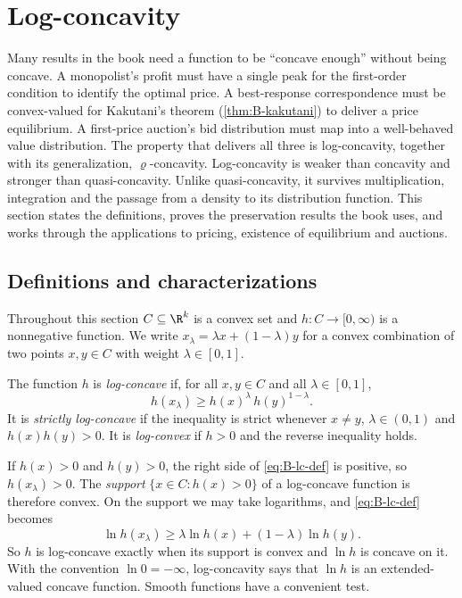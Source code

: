 \section{Log-concavity}\label{sec:B-logconcave}

Many results in the book need a function to be ``concave enough'' without being concave. A monopolist's
profit must have a single peak for the first-order condition to identify the optimal price. A
best-response correspondence must be convex-valued for Kakutani's theorem (\cref{thm:B-kakutani}) to deliver a
price equilibrium. A first-price auction's bid distribution must map into a well-behaved value distribution.
The property that delivers all three is log-concavity, together with its generalization,
$\varrho$-concavity. Log-concavity is weaker than concavity and stronger than quasi-concavity. Unlike
quasi-concavity, it survives multiplication, integration and the passage from a density to its
distribution function. This section states the definitions, proves the preservation results the book
uses, and works through the applications to pricing, existence of equilibrium and auctions.

\subsection{Definitions and characterizations}\label{sec:B-lc-def}

Throughout this section $C \subseteq \R^k$ is a convex set and $h : C \to [0, \infty)$ is a nonnegative
function. We write $x_\lambda = \lambda x + (1 - \lambda)y$ for a convex combination of two points $x, y \in C$
with weight $\lambda \in [0, 1]$.

\begin{definition}\label{def:B-logconcave}
The function $h$ is \emph{log-concave} if, for all $x, y \in C$ and all $\lambda \in [0, 1]$,
\begin{equation}\label{eq:B-lc-def}
  h(x_\lambda) \geq h(x)^\lambda\, h(y)^{1 - \lambda}.
\end{equation}
It is \emph{strictly log-concave} if the inequality is strict whenever $x \neq y$, $\lambda \in (0, 1)$ and
$h(x)h(y) > 0$. It is \emph{log-convex} if $h > 0$ and the reverse inequality holds.
\end{definition}

If $h(x) > 0$ and $h(y) > 0$, the right side of \eqref{eq:B-lc-def} is positive, so $h(x_\lambda) > 0$. The
\emph{support} $\{x \in C : h(x) > 0\}$ of a log-concave function is therefore convex. On the support we may
take logarithms, and \eqref{eq:B-lc-def} becomes
\[
  \ln h(x_\lambda) \geq \lambda \ln h(x) + (1 - \lambda)\ln h(y).
\]
So $h$ is log-concave exactly when its support is convex and $\ln h$ is concave on it. With the convention
$\ln 0 = -\infty$, log-concavity says that $\ln h$ is an extended-valued concave function. Smooth functions
have a convenient test.

